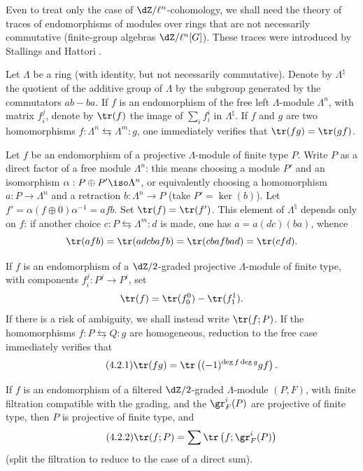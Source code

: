 \documentclass[oneside]{book}
\begin{document}
Even to treat only the case of $\dZ/\ell^n$-cohomology, we shall need the
theory of traces of endomorphisms of modules over rings that are not
necessarily commutative (finite-group algebras $\dZ/\ell^n[G]$). These
traces were introduced by Stallings and Hattori \cite{ba76}.

Let $\Lambda$ be a ring (with identity, but not necessarily commutative).
Denote by $\Lambda^\natural$ the quotient of the additive group of $\Lambda$
by the subgroup generated by the commutators $a b-b a$. If $f$ is an
endomorphism of the free left $\Lambda$-module $\Lambda^n$, with matrix
$f_i^j$, denote by $\tr(f)$ the image of $\sum_i f_i^i$ in
$\Lambda^\natural$. If $f$ and $g$ are two homomorphisms
$f:\Lambda^n \leftrightarrows \Lambda^m : g$, one immediately verifies that
$\tr(f g) = \tr(g f)$.

Let $f$ be an endomorphism of a projective $\Lambda$-module of finite type
$P$. Write $P$ as a direct factor of a free module $\Lambda^n$: this means
choosing a module $P'$ and an isomorphism
$\alpha:P\oplus P'\iso \Lambda^n$, or equivalently choosing a homomorphism
$a:P\to \Lambda^n$ and a retraction $b:\Lambda^n\to P$ (take
$P'=\ker(b)$). Let $f'=\alpha(f\oplus 0)\alpha^{-1} =af b$. Set
$\tr(f) = \tr(f')$. This element of $\Lambda^\natural$ depends only on $f$:
if another choice $c:P\leftrightarrows \Lambda^m:d$ is made, one has
$a=a(dc)(ba)$, whence
\[
 \tr(a f b) = \tr(adcbafb) = \tr(cbafbad) = \tr(cfd) \text{.}
\]

If $f$ is an endomorphism of a $\dZ/2$-graded projective
$\Lambda$-module of finite type, with components $f_i^j:P^j\to P^i$, set
\[
  \tr(f) = \tr(f_0^0) - \tr(f_1^1) \text{.}
\]
If there is a risk of ambiguity, we shall instead write $\tr(f;P)$. If the
homomorphisms $f:P\leftrightarrows Q:g$ are homogeneous, reduction to the
free case immediately verifies that
\begin{equation*}\tag{4.2.1}\label{II:eq:4-2-1}
  \tr(f g) = \tr\left((-1)^{\deg f \deg g} g f\right) \text{.}
\end{equation*}

If $f$ is an endomorphism of a filtered $\dZ/2$-graded $\Lambda$-module
$(P,F)$, with finite filtration compatible with the grading, and the
$\gr_F^i(P)$ are projective of finite type, then $P$ is projective of finite
type, and
\begin{equation*}\tag{4.2.2}\label{II:eq:4-2-2}
  \tr(f;P) = \sum \tr\left(f; \gr_F^i(P) \right)
\end{equation*}
(split the filtration to reduce to the case of a direct sum).
\end{document}
